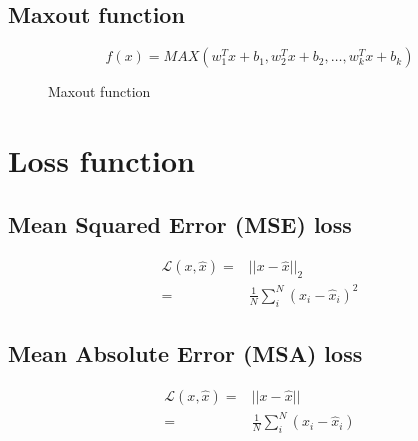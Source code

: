 \subsection{Maxout function}
\begin{equation}
    f(x) = MAX(w^{T}_{1}x + b_{1},w^{T}_{2}x + b_{2},\ldots,w^{T}_{k}x + b_{k})
\end{equation}

\begin{figure}[H]
    \centering
    \caption{Maxout function}
\end{figure}

\section{Loss function}
\subsection{Mean Squared Error (MSE) loss}
\begin{equation}
    \begin{aligned}
    \mathcal{L}(x,\hat{x}) =& || x - \hat{x} ||_{2}\\
                           =& \frac{1}{N}\sum^{N}_{i} (x_{i} - \hat{x}_{i})^{2} 
    \end{aligned}
\end{equation}
\subsection{Mean Absolute Error (MSA) loss}
\begin{equation}
    \begin{aligned}
    \mathcal{L}(x,\hat{x}) =& || x - \hat{x} ||\\
                           =& \frac{1}{N}\sum^{N}_{i} (x_{i} - \hat{x}_{i}) 
    \end{aligned}
\end{equation}
